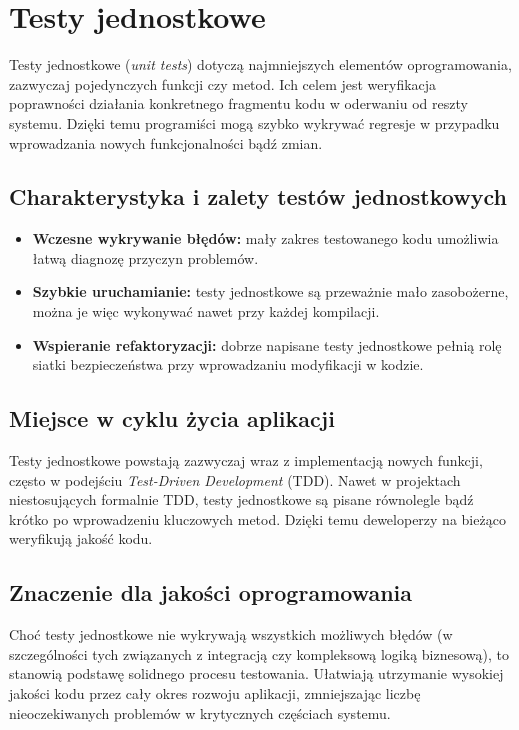 \documentclass[12pt]{report}
\begin{document}
\section{Testy jednostkowe}
\label{sec:testy-jednostkowe}
Testy jednostkowe (\emph{unit tests}) dotyczą najmniejszych elementów oprogramowania, zazwyczaj pojedynczych funkcji czy metod. Ich celem jest weryfikacja poprawności działania konkretnego fragmentu kodu w oderwaniu od reszty systemu. Dzięki temu programiści mogą szybko wykrywać regresje w przypadku wprowadzania nowych funkcjonalności bądź zmian.

\subsection*{Charakterystyka i zalety testów jednostkowych}
\begin{itemize}
    \item \textbf{Wczesne wykrywanie błędów:} mały zakres testowanego kodu umożliwia łatwą diagnozę przyczyn problemów.
    \item \textbf{Szybkie uruchamianie:} testy jednostkowe są przeważnie mało zasobożerne, można je więc wykonywać nawet przy każdej kompilacji.
    \item \textbf{Wspieranie refaktoryzacji:} dobrze napisane testy jednostkowe pełnią rolę siatki bezpieczeństwa przy wprowadzaniu modyfikacji w kodzie.
\end{itemize}

\subsection*{Miejsce w cyklu życia aplikacji}
Testy jednostkowe powstają zazwyczaj wraz z implementacją nowych funkcji, często w podejściu \emph{Test-Driven Development} (TDD). Nawet w projektach niestosujących formalnie TDD, testy jednostkowe są pisane równolegle bądź krótko po wprowadzeniu kluczowych metod. Dzięki temu deweloperzy na bieżąco weryfikują jakość kodu.

\subsection*{Znaczenie dla jakości oprogramowania}
Choć testy jednostkowe nie wykrywają wszystkich możliwych błędów (w szczególności tych związanych z integracją czy kompleksową logiką biznesową), to stanowią podstawę solidnego procesu testowania. Ułatwiają utrzymanie wysokiej jakości kodu przez cały okres rozwoju aplikacji, zmniejszając liczbę nieoczekiwanych problemów w krytycznych częściach systemu.
\end{document}
